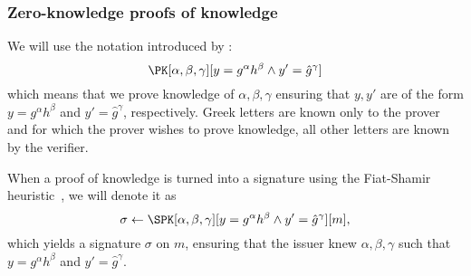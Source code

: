 \subsubsection{Zero-knowledge proofs of knowledge}%
\label{ZKPK}

We will use the notation introduced by \citet{PKnotation}:
\begin{equation}\label{PKexample}
  \PK[\alpha, \beta, \gamma][y = g^\alpha h^\beta \land y' = \hat g^\gamma]
\end{equation}
which means that we prove knowledge of \(\alpha, \beta, \gamma\) ensuring that 
\(y, y'\) are of the form \(y = g^\alpha h^\beta\) and \(y' = \hat g^\gamma\), 
respectively.
Greek letters are known only to the prover and for which the prover wishes to 
prove knowledge, all other letters are known by the verifier.

When a proof of knowledge is turned into a signature using the Fiat-Shamir 
heuristic~\cite{FiatShamirHeuristic}, we will denote it as
\begin{equation*}\label{SPKexample}
  \sigma\gets \SPK[\alpha, \beta, \gamma]%
  [y = g^\alpha h^\beta \land y' = \hat g^\gamma]%
  [m],
\end{equation*}
which yields a signature \(\sigma\) on \(m\), ensuring that the issuer knew 
\(\alpha, \beta, \gamma\) such that \(y = g^\alpha h^\beta\) and \(y' = 
  \hat{g}^\gamma\).


